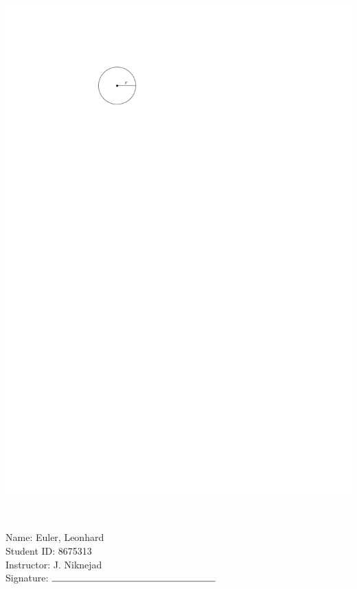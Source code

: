 \documentclass[12pt]{amsart}
\begin{document}
\begin{enumerate}
\includegraphics[scale = 0.8]{circle}

\vspace{1cm}
\newpage  $ $   \newpage\end{enumerate}\graphicspath{{C:/Users/iainc/anaconda3/Randomizer/Sample Course/Sample Assessment/}}\setcounter{page}{1}


\thispagestyle{fancy}

 \noindent Name: Euler, Leonhard \vspace{.3cm} \\\noindent Student ID: 8675313 \vspace{.3cm} \\\noindent Instructor: J. Niknejad \vspace{.3cm} \\\noindent Signature: $\rule{6cm}{0.15mm}$ \vspace{.3cm} \\ 
\end{document}
